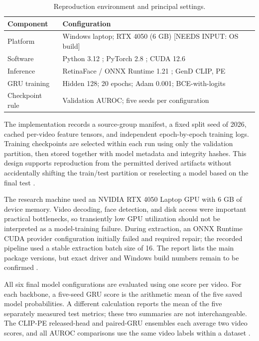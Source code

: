 \documentclass[conference,10pt]{IEEEtran}
\begin{document}
\begin{table}[!htbp]
\caption{Reproduction environment and principal settings.}
\centering\small
\setlength{\tabcolsep}{3pt}
\begin{tabular}{>{\raggedright\arraybackslash}p{}>{\raggedright\arraybackslash}p{}}
\toprule
\textbf{Component} & \textbf{Configuration} \\
\midrule
Platform & Windows laptop; RTX 4050 (6 GB) [NEEDS INPUT: OS build] \\
Software & Python 3.12 \cite{python2026}; PyTorch 2.8 \cite{pytorch2026}; CUDA 12.6 \\
Inference & RetinaFace / ONNX Runtime 1.21 \cite{onnxruntime2026}; GenD CLIP, PE \\
GRU training & Hidden 128; 20 epochs; Adam 0.001; BCE-with-logits \\
Checkpoint rule & Validation AUROC; five seeds per configuration \\
\bottomrule
\end{tabular}
\label{tab:2}
\end{table}
The implementation records a source-group manifest, a fixed split seed of 2026, cached per-video feature tensors, and independent epoch-by-epoch training logs. Training checkpoints are selected within each run using only the validation partition, then stored together with model metadata and integrity hashes. This design supports reproduction from the permitted derived artifacts without accidentally shifting the train/test partition or reselecting a model based on the final test \cite{capstone2026}.

The research machine used an NVIDIA RTX 4050 Laptop GPU with 6 GB of device memory. Video decoding, face detection, and disk access were important practical bottlenecks, so transiently low GPU utilization should not be interpreted as a model-training failure. During extraction, an ONNX Runtime CUDA provider configuration initially failed and required repair; the recorded pipeline used a stable extraction batch size of 16. The report lists the main package versions, but exact driver and Windows build numbers remain to be confirmed \cite{capstone2026}.

All six final model configurations are evaluated using one score per video. For each backbone, a five-seed GRU score is the arithmetic mean of the five saved model probabilities. A different calculation reports the mean of the five separately measured test metrics; these two summaries are not interchangeable. The CLIP-PE released-head and paired-GRU ensembles each average two video scores, and all AUROC comparisons use the same video labels within a dataset \cite{capstone2026}.
\end{document}
